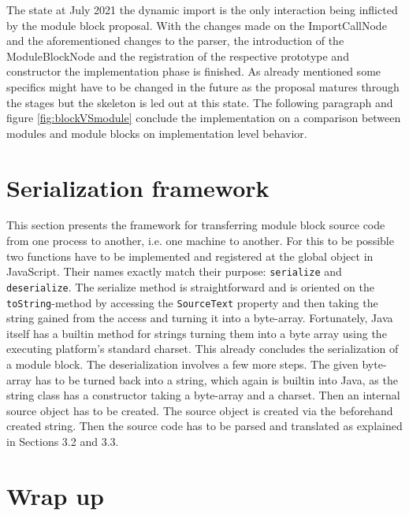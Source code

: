 The state at July 2021 the dynamic import is the only interaction being inflicted by the module block proposal. With the changes made on the ImportCallNode and the aforementioned changes to the parser, the introduction of the ModuleBlockNode and the registration of the respective prototype and constructor the implementation phase is finished. As already mentioned some specifics might have to be changed in the future as the proposal matures through the stages but the skeleton is led out at this state. The following paragraph and figure \ref{fig:blockVSmodule} conclude the implementation on a comparison between modules and module blocks on implementation level behavior.

\section{Serialization framework}

This section presents the framework for transferring module block source code from one process to another, i.e. one machine to another. For this to be possible two functions have to be implemented and registered at the global object in JavaScript. Their names exactly match their purpose: \texttt{serialize} and \texttt{deserialize}. The serialize method is straightforward and is oriented on the \texttt{toString}-method by accessing the \texttt{SourceText} property and then taking the string gained from the access and turning it into a byte-array. Fortunately, Java itself has a builtin method for strings turning them into a byte array using the executing platform's standard charset. This already concludes the serialization of a module block. The deserialization involves a few more steps. The given byte-array has to be turned back into a string, which again is builtin into Java, as the string class has a constructor taking a byte-array and a charset. Then an internal source object has to be created. The source object is created via the beforehand created string. Then the source code has to be parsed and translated as explained in Sections 3.2 and 3.3.

\section{Wrap up}

